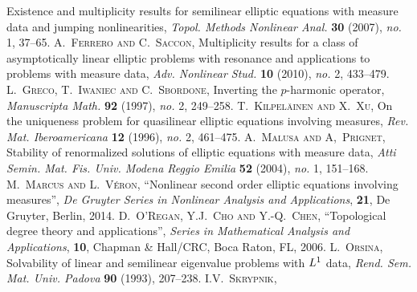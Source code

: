 \documentclass[twoside,reqno]{amsart}
\numberwithin{equation}{section}
\theoremstyle{definition}
\newcommand{\au}[1]{\textsc{#1}}
\newcommand{\titleart}[1]{\textrm{#1}}
\newcommand{\jour}[1]{\textit{#1}}
\newcommand{\volart}[1]{\textbf{#1}}
\newcommand{\no}[1]{\textit{no.} {#1}}
\begin{document}
\begin{thebibliography}{99}
\titleart{Existence and multiplicity results for semilinear
elliptic equations with measure data and jumping nonlinearities},
\jour{Topol. Methods Nonlinear Anal.} \volart{30} 
(2007), \no{1}, 37--65.
%
\au{A.~Ferrero and C.~Saccon},
\titleart{Multiplicity results for a class of asymptotically 
linear elliptic problems with resonance and applications to
problems with measure data},
\jour{Adv. Nonlinear Stud.} \volart{10} 
(2010), \no{2}, 433--479.
%
\au{L.~Greco, T.~Iwaniec and C.~Sbordone},
\titleart{Inverting the {$p$}-harmonic operator},
\jour{Manuscripta Math.} \volart{92} (1997),
\no{2}, 249--258.
%
%
\au{T.~Kilpel{\"a}inen and X.~Xu},
\titleart{On the uniqueness problem for quasilinear 
elliptic equations involving measures},
\jour{Rev. Mat. Iberoamericana} \volart{12} 
(1996), \no{2}, 461--475.
%
%
%
\au{A.~Malusa and A,~Prignet},
\titleart{Stability of renormalized solutions of elliptic 
equations with measure data},
\jour{Atti Semin. Mat. Fis. Univ. Modena Reggio Emilia} 
\volart{52} (2004), \no{1}, 151--168.
%
\au{M.~Marcus and L.~V\'eron},
``Nonlinear second order elliptic equations involving measures'',
\textit{De Gruyter Series in Nonlinear Analysis and Applications}, 
\textbf{21}, De Gruyter, Berlin, 2014.
%
\au{D.~O'Regan, Y.J.~Cho and Y.-Q.~Chen},
``Topological degree theory and applications'',
\textit{Series in Mathematical Analysis and Applications},
\textbf{10}, Chapman \& Hall/CRC, Boca Raton, FL, 2006.
%
\au{L.~Orsina}, 
\titleart{Solvability of linear and semilinear eigenvalue 
problems with {$L\sp 1$} data}, 
\jour{Rend. Sem. Mat. Univ. Padova} \volart{90} (1993), 
207--238.
%
\au{I.V.~Skrypnik},

\end{thebibliography}
\end{document}

